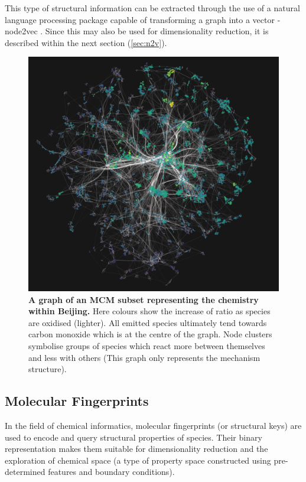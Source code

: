 This type of structural information can be extracted through the use of a natural language processing package capable of transforming a graph into a vector - node2vec \citep{node2vec}. Since this may also be used for dimensionality reduction, it is described within the next section (\autoref{sec:n2v}).


\begin{figure}[H]
  \centering
  \includegraphics[width=\textwidth]{4fig/graph/oxidised_ratio.png}
  \caption{\textbf{A graph of an MCM subset representing the chemistry within Beijing.} Here colours show the increase of  ratio as species are oxidised (lighter). All emitted species ultimately tend towards carbon monoxide which is at the centre of the graph. Node clusters symbolise groups of species which react more between themselves and less with others (This graph only represents the mechanism structure).}
  \label{fig:vk}
\end{figure}





\subsection{Molecular Fingerprints}\label{sec:fingerprints}

In the field of chemical informatics, molecular fingerprints (or structural keys) are used to encode and query structural properties of species. Their binary representation makes them suitable for dimensionality reduction and the exploration of chemical space (a type of property space constructed using pre-determined features and boundary conditions).

